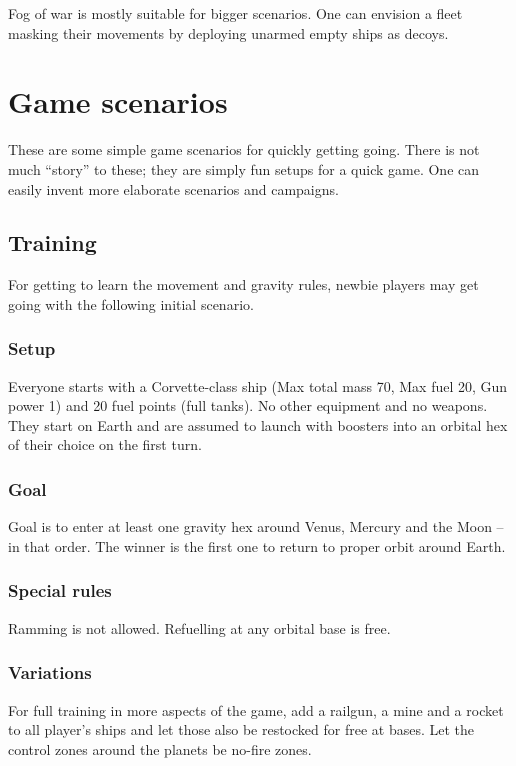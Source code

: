 \documentclass[a4paper,12pt,notitlepage,twocolumn]{article}
\begin{document}
Fog of war is mostly suitable for bigger scenarios. One can envision a
fleet masking their movements by deploying unarmed empty ships as
decoys. 


\section{Game scenarios}
\label{sec:game_scenarios}

These are some simple game scenarios for quickly getting going. There
is not much ``story'' to these; they are simply
fun setups for a quick game. One can easily invent more elaborate
scenarios and campaigns. 

\subsection{Training}

For getting to learn the movement and gravity rules, newbie players
may get going with the following initial scenario.

\subsubsection*{Setup}
Everyone starts with a Corvette-class ship (Max total mass 70, Max
fuel 20, Gun power 1) and 20 fuel points (full
tanks). No other equipment and no weapons. They start on Earth and are
assumed to launch with boosters into an orbital hex of their choice on
the first turn.   

\subsubsection*{Goal}

Goal is to enter at least one gravity hex around
Venus, Mercury and the Moon -- in that order. The winner is the first
one to return to proper orbit around Earth. 

\subsubsection*{Special rules}
Ramming is not allowed. Refuelling at any orbital base is free. 


\subsubsection*{Variations}

For full training in more aspects of the game, add a railgun, a mine and a
rocket to all player's ships and let those also be restocked for free
at bases. Let the control zones around the planets be no-fire
zones. 
\end{document}
